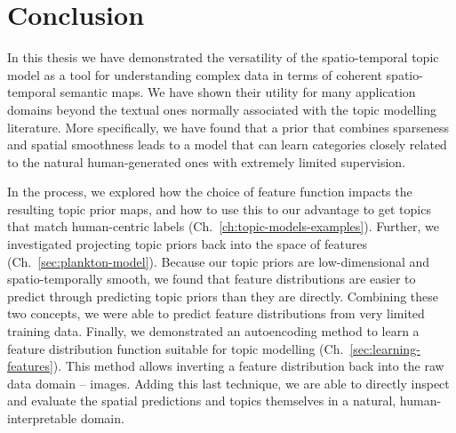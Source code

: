 
\chapter{Conclusion} \label{ch:conclusion}

In this thesis we have demonstrated the versatility of the spatio-temporal topic model as a tool for understanding complex data in terms of coherent spatio-temporal semantic maps. We have shown their utility for many application domains beyond the textual ones normally associated with the topic modelling literature. More specifically, we have found that a prior that combines sparseness and spatial smoothness leads to a model that can learn categories closely related to the natural human-generated ones with extremely limited supervision.

In the process, we explored how the choice of feature function impacts the resulting topic prior maps, and how to use this to our advantage to get topics that match human-centric labels (Ch.~\ref{ch:topic-models-examples}). Further, we investigated projecting topic priors back into the space of features (Ch.~\ref{sec:plankton-model}). Because our topic priors are low-dimensional and spatio-temporally smooth, we found that feature distributions are easier to predict through predicting topic priors than they are directly. Combining these two concepts, we were able to predict feature distributions from very limited training data. Finally,
we demonstrated an autoencoding method to learn a feature distribution function suitable for topic modelling (Ch.~\ref{sec:learning-features}). This method allows inverting a feature distribution back into the raw data domain -- images. Adding this last technique, we are able to directly inspect and evaluate the spatial predictions and topics themselves in a natural, human-interpretable domain.

